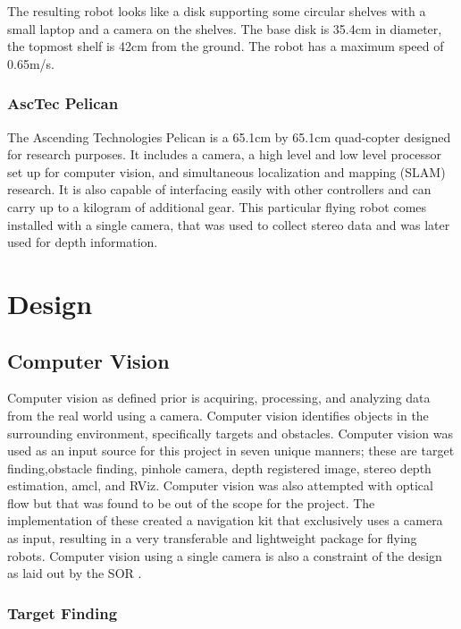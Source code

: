 \documentclass{article}[12]
\begin{document}
		The resulting robot looks like a disk supporting some circular shelves with a small laptop and a camera on the shelves. The base disk is 35.4cm in diameter, the topmost shelf is 42cm from the ground. The robot has a maximum speed of 0.65m/s. 
		
		\subsubsection{AscTec Pelican}
		
		The Ascending Technologies Pelican is a 65.1cm by 65.1cm quad-copter designed for research purposes\cite{asctec}. It includes a camera, a high level and low level processor set up for computer vision, and simultaneous localization and mapping (SLAM) research. It is also capable of interfacing easily with other controllers and can carry up to a kilogram of additional gear. This particular flying robot comes installed with a single camera, that was used to collect stereo data and was later used for depth information.

		
\section{Design}
	
	\subsection{Computer Vision}
	
	Computer vision as defined prior is acquiring, processing, and analyzing data from the real world using a camera. Computer vision identifies objects in the surrounding environment, specifically targets and obstacles. Computer vision was used as an input source for this project in seven unique manners; these are target finding,obstacle finding, pinhole camera, depth registered image, stereo depth estimation, amcl, and RViz. Computer vision was also attempted with optical flow but that was found to be out of the scope for the project. The implementation of these created a navigation kit that exclusively uses a camera as input, resulting in a very transferable and lightweight package for flying robots. Computer vision using a single camera is also a constraint of the design as laid out by the SOR \cite{sor}.

		\subsubsection{Target Finding}
		
\end{document}
